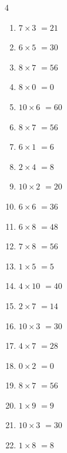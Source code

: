 \begin{multicols}{4}
\begin{enumerate}
  \item $7\times 3$
        $=21$

  \item $6\times 5$
        $=30$

\columnbreak %

\resetques

  \item $8\times 7$
        $=56$

  \item $8\times 0$
        $=0$

  \item $10\times 6$
        $=60$

  \item $8\times 7$
        $=56$

  \item $6\times 1$
        $=6$

  \item $2\times 4$
        $=8$

  \item $10\times 2$
        $=20$

  \item $6\times 6$
        $=36$

  \item $6\times 8$
        $=48$

  \item $7\times 8$
        $=56$

  \item $1\times 5$
        $=5$

  \item $4\times 10$
        $=40$

  \item $2\times 7$
        $=14$

  \item $10\times 3$
        $=30$

  \item $4\times 7$
        $=28$

  \item $0\times 2$
        $=0$

  \item $8\times 7$
        $=56$

  \item $1\times 9$
        $=9$

  \item $10\times 3$
        $=30$

  \item $1\times 8$
        $=8$


\end{enumerate}
\end{multicols}
